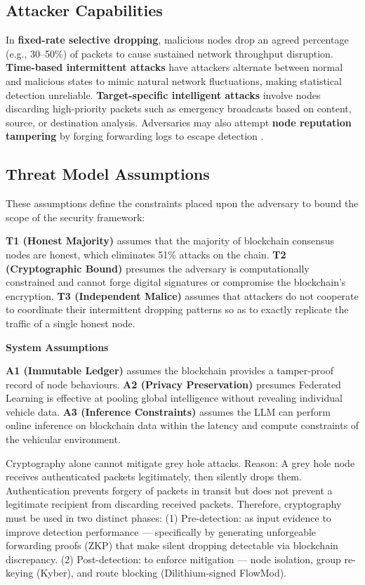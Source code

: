 \documentclass[12pt, a4paper]{report}
\newcommand{\mypar}{\vspace{0.8em}\noindent}
\begin{document}
\subsection{Attacker Capabilities}

In \textbf{fixed-rate selective dropping}, malicious nodes drop an agreed percentage (e.g., 30--50\%) of packets to cause sustained network throughput disruption.
\textbf{Time-based intermittent attacks} have attackers alternate between normal and malicious states to mimic natural network fluctuations, making statistical detection unreliable.
\textbf{Target-specific intelligent attacks} involve nodes discarding high-priority packets such as emergency broadcasts based on content, source, or destination analysis.
Adversaries may also attempt \textbf{node reputation tampering} by forging forwarding logs to escape detection \cite{sahu2024}.

\subsection{Threat Model Assumptions}

\mypar
These assumptions define the constraints placed upon the adversary to bound the scope of the security framework:

\textbf{T1 (Honest Majority)} assumes that the majority of blockchain consensus nodes are honest, which eliminates 51\% attacks on the chain.
\textbf{T2 (Cryptographic Bound)} presumes the adversary is computationally constrained and cannot forge digital signatures or compromise the blockchain's encryption.
\textbf{T3 (Independent Malice)} assumes that attackers do not cooperate to coordinate their intermittent dropping patterns so as to exactly replicate the traffic of a single honest node.

\mypar
\textbf{System Assumptions}

\textbf{A1 (Immutable Ledger)} assumes the blockchain provides a tamper-proof record of node behaviours.
\textbf{A2 (Privacy Preservation)} presumes Federated Learning is effective at pooling global intelligence without revealing individual vehicle data.
\textbf{A3 (Inference Constraints)} assumes the LLM can perform online inference on blockchain data within the latency and compute constraints of the vehicular environment.

\clearpage %


Cryptography alone cannot mitigate grey hole attacks.
Reason: A grey hole node receives authenticated packets legitimately, then
silently drops them. Authentication prevents forgery of packets in transit
but does not prevent a legitimate recipient from discarding received packets.
Therefore, cryptography must be used in two distinct phases:
  (1) Pre-detection: as input evidence to improve detection performance —
      specifically by generating unforgeable forwarding proofs (ZKP) that
      make silent dropping detectable via blockchain discrepancy.
  (2) Post-detection: to enforce mitigation — node isolation, group
      re-keying (Kyber), and route blocking (Dilithium-signed FlowMod).
\end{document}
